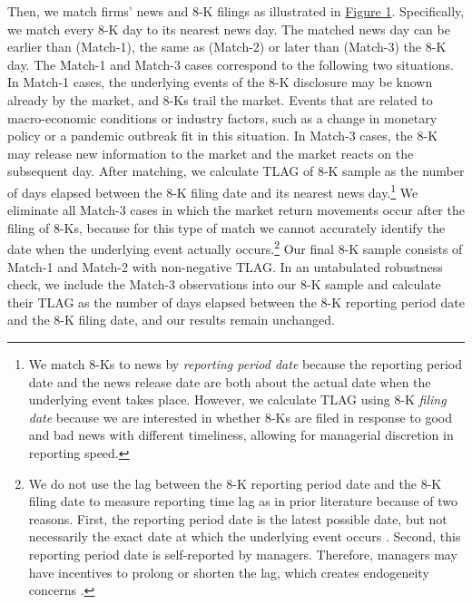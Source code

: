 \documentclass[letterpaper,11pt]{article}
\begin{document}
\begin{spacing}{1.5}
Then, we match firms' news and 8-K filings as illustrated in \hyperref[fig1]{Figure 1}. Specifically, we match every 8-K day to its nearest news day. The matched news day can be earlier than (Match-1), the same as (Match-2) or later than (Match-3) the 8-K day. The Match-1 and Match-3 cases correspond to the following two situations. In Match-1 cases, the underlying events of the 8-K disclosure may be known already by the market, and 8-Ks trail the market. Events that are related to macro-economic conditions or industry factors, such as a change in monetary policy or a pandemic outbreak fit in this situation. In Match-3 cases, the 8-K may release new information to the market and the market reacts on the subsequent day. After matching, we calculate TLAG of 8-K sample as the number of days elapsed between the 8-K filing date and its nearest news day.\footnote{We match 8-Ks to news by \textit{reporting period date} because the reporting period date and the news release date are both about the actual date when the underlying event takes place. However, we calculate TLAG using 8-K \textit{filing date} because we are interested in whether 8-Ks are filed in response to good and bad news with different timeliness, allowing for managerial discretion in reporting speed.} We eliminate all Match-3 cases in which the market return movements occur after the filing of 8-Ks, because for this type of match we cannot accurately identify the date when the underlying event actually occurs.\footnote{We do not use the lag between the 8-K reporting period date and the 8-K filing date to measure reporting time lag as in prior literature \cite{carterRelevanceForm8K1999, niessnerStrategicDisclosureTiming2015, chapmanInformationOverloadDisclosure2019} because of two reasons. First, the reporting period date is the latest possible date, but not necessarily the exact date at which the underlying event occurs \cite{secFinalRuleAdditional2004}. Second, this reporting period date is self-reported by managers. Therefore, managers may have incentives to prolong or shorten the lag, which creates endogeneity concerns \cite{chapmanInformationOverloadDisclosure2019}. } Our final 8-K sample consists of Match-1 and Match-2 with non-negative TLAG. In an untabulated robustness check, we include the Match-3 observations into our 8-K sample and calculate their TLAG as the number of days elapsed between the 8-K reporting period date and the 8-K filing date, and our results remain unchanged. 


\end{spacing}
\end{document}
